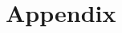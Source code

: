 \documentclass{llncs}
\begin{document}
\begin{thebibliography}{25}





\end{thebibliography}

\newpage

\section*{Appendix}
\end{document}
